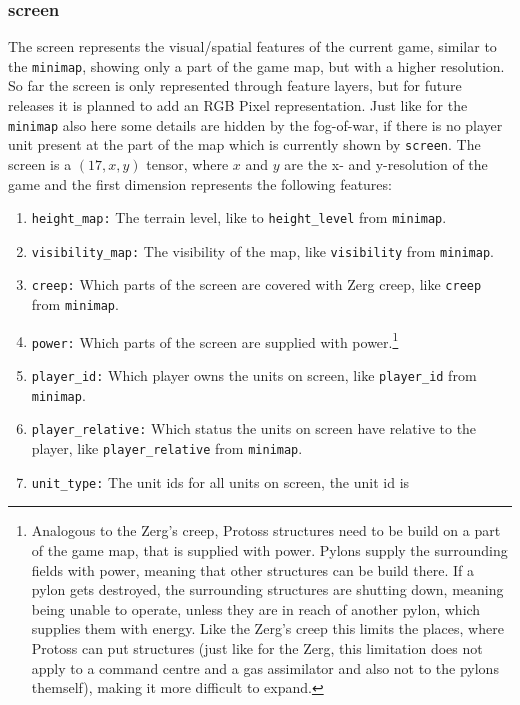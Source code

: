 \documentclass{article}
\begin{document}
\subsubsection{screen}
The screen represents the visual/spatial features of the current game, similar 
to the \texttt{minimap}, showing only a part of the game map, but with a higher 
resolution. So far the screen is only represented through feature layers, but 
for future releases it is planned to add an RGB Pixel representation. Just like 
for the \texttt{minimap} also here some details are hidden by the fog-of-war, 
if there is no player unit present at the part of the map which is currently 
shown by \texttt{screen}. The screen is a $(17, x, y)$ tensor, where $x$ and 
$y$ are the x- and y-resolution of the game and the first dimension represents 
the following features:
\begin{enumerate}[noitemsep,start=0]
\item \texttt{height\_map:} The terrain level, like to \texttt{height\_level} 
from \texttt{minimap}.
\item \texttt{visibility\_map:} The visibility of the map, like 
\texttt{visibility} from \texttt{minimap}.
\item \texttt{creep:} Which parts of the screen are covered with Zerg creep, 
like \texttt{creep} from \texttt{minimap}.
\item \texttt{power:} Which parts of the screen are supplied with 
power.\footnote{Analogous to the Zerg's creep, Protoss structures need to be 
build on a part of the game map, that is supplied with power. Pylons supply the 
surrounding fields with power, meaning that other structures can be build 
there. If a pylon gets destroyed, the surrounding structures are shutting down, 
meaning being unable to operate, unless they are in reach of another pylon, 
which supplies them with energy. Like the Zerg's creep this limits the places, 
where Protoss can put structures (just like for the Zerg, this limitation does 
not apply to a command centre and a gas assimilator and also not to the pylons 
themself), making it more difficult to expand.}
\item \texttt{player\_id:} Which player owns the units on screen, like 
\texttt{player\_id} from \texttt{minimap}.
\item \texttt{player\_relative:} Which status the units on screen have relative 
to the player, like \texttt{player\_relative} from \texttt{minimap}.
\item \texttt{unit\_type:} The unit ids for all units on screen, the unit id is 

\end{enumerate}
\end{document}
